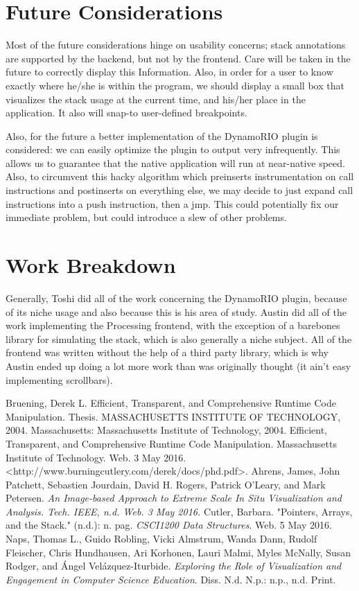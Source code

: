 \documentclass[12pt]{article}
\begin{document}
\section{Future Considerations}
Most of the future considerations hinge on usability concerns; stack annotations are supported
by the backend, but not by the frontend. Care will be taken in the future to correctly display this
Information. Also, in order for a user to know exactly where he/she is within the program, we
should display a small box that visualizes the stack usage at the current time, and his/her place
in the application. It also will snap-to user-defined breakpoints.

Also, for the future a better implementation of the DynamoRIO plugin is considered: we
can easily optimize the plugin to output very infrequently. This allows us to guarantee that the
native application will run at near-native speed. Also, to circumvent this hacky algorithm which
preinserts instrumentation on call instructions and postinserts on everything else, we may decide
to just expand call instructions into a push instruction, then a jmp. This could potentially fix our
immediate problem, but could introduce a slew of other problems.

\section{Work Breakdown}
Generally, Toshi did all of the work concerning the DynamoRIO plugin, because of its niche usage
and also because this is his area of study. Austin did all of the work implementing the Processing
frontend, with the exception of a barebones library for simulating the stack, which is also generally a
niche subject. All of the frontend was written without the help of a third party library, which is why
Austin ended up doing a lot more work than was originally thought (it ain’t easy implementing
scrollbars).

\begin{thebibliography}{9}
    Bruening, Derek L. Efficient, Transparent, and Comprehensive Runtime Code Manipulation.
    Thesis. MASSACHUSETTS INSTITUTE OF TECHNOLOGY, 2004. Massachusetts: Massachusetts Institute
    of Technology, 2004. Efficient, Transparent, and Comprehensive Runtime Code Manipulation.
    Massachusetts Institute of Technology. Web. 3 May 2016.
    <http://www.burningcutlery.com/derek/docs/phd.pdf>.
    Ahrens, James, John Patchett, Sebastien Jourdain, David H. Rogers, Patrick O'Leary, and
    Mark Petersen. \textit{An Image-based Approach to Extreme Scale In Situ Visualization and
    Analysis. Tech. IEEE, n.d. Web. 3 May 2016.}
    Cutler, Barbara. "Pointers, Arrays, and the Stack." (n.d.): n. pag. \textit{CSCI1200 Data Structures}. Web.
    5 May 2016.
    Naps, Thomas L., Guido Robling, Vicki Almstrum, Wanda Dann, Rudolf Fleischer, Chris Hundhausen, Ari
    Korhonen, Lauri Malmi, Myles McNally, Susan Rodger, and Ángel Velázquez-Iturbide. \textit{Exploring 
    the Role of Visualization and Engagement in Computer Science Education}. Diss. N.d. N.p.: n.p., n.d.
    Print.
\end{thebibliography}
\end{document}

